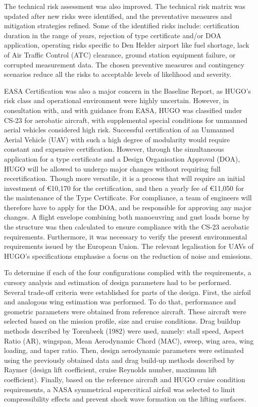 The technical risk assessment was also improved. The technical risk matrix was updated after new risks were identified, and the preventative measures and mitigation strategies refined. Some of the identified risks include: certification duration in the range of years, rejection of type certificate and/or DOA application, operating risks specific to Den Helder airport like fuel shortage, lack of Air Traffic Control (ATC) clearance, ground station equipment failure, or corrupted measurement data. The chosen preventive measures and contingency scenarios reduce all the risks to acceptable levels of likelihood and severity.

EASA Certification was also a major concern in the Baseline Report, as HUGO's risk class and operational environment were highly uncertain. However, in consultation with, and with guidance from EASA, HUGO was classified under CS-23 for aerobatic aircraft, with supplemental special conditions for unmanned aerial vehicles considered high risk. Successful certification of an Unmanned Aerial Vehicle (UAV) with such a high degree of modularity would require constant and expensive certification. However, through the simultaneous application for a type certificate and a Design Organisation Approval (DOA), HUGO will be allowed to undergo major changes without requiring full recertification. Though more versatile, it is a process that will require an initial investment of \euro{10,170} for the certification, and then a yearly fee of \euro{11,050} for the maintenance of the Type Certificate. For compliance, a team of engineers will therefore have to apply for the DOA, and be responsible for approving any major changes. A flight envelope combining both manoeuvring and gust loads borne by the structure was then calculated to ensure compliance with the CS-23 aerobatic requirements. Furthermore, it was necessary to verify the present environmental requirements issued by the European Union. The relevant legalisation for UAVs of HUGO's specifications emphasise a focus on the reduction of noise and emissions.   

To determine if each of the four configurations complied with the requirements, a cursory analysis and estimation of design parameters had to be performed. Several trade-off criteria were established for parts of the design. First, the airfoil and analogous wing estimation was performed. To do that, performance and geometric parameters were obtained from reference aircraft. These aircraft were selected based on the mission profile, size and cruise conditions. Drag buildup methods described by Torenbeek (1982) \cite{Torenbeek1982} were used, namely: stall speed, Aspect Ratio (AR), wingspan, Mean Aerodynamic Chord (MAC), sweep, wing area, wing loading, and taper ratio. Then, design aerodynamic parameters were estimated using the previously obtained data and drag build-up methods described by Raymer (design lift coefficient, cruise Reynolds number, maximum lift coefficient). Finally, based on the reference aircraft and HUGO cruise condition requirements, a NASA symmetrical supercritical airfoil was selected to limit compressibility effects and prevent shock wave formation on the lifting surfaces.

